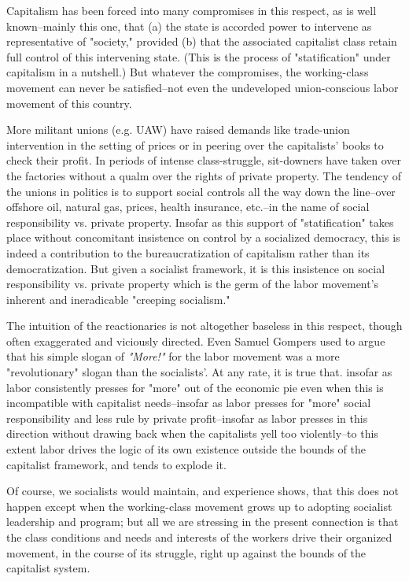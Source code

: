 Capitalism has been forced into many compromises in this respect, as is well known--mainly this one, that (a) the state is accorded power to intervene as representative of "society," provided (b) that the associated capitalist class retain full control of this intervening state. (This is the process of "statification" under capitalism in a nutshell.) But whatever the compromises, the working-class movement can never be satisfied--not even the undeveloped union-conscious labor movement of this country.

More militant unions (e.g. UAW) have raised demands like trade-union intervention in the setting of prices or in peering over the capitalists' books to check their profit. In periods of intense class-struggle, sit-downers have taken over the factories without a qualm over the rights of private property. The tendency of the unions in politics is to support social controls all the way down the line--over offshore oil, natural gas, prices, health insurance, etc.--in the name of social responsibility vs. private property. Insofar as this support of "statification" takes place without concomitant insistence on control by a socialized democracy, this is indeed a contribution to the bureaucratization of capitalism rather than its democratization. But given a socialist framework, it is this insistence on social responsibility vs. private property which is the germ of the labor movement's inherent and ineradicable "creeping socialism."

The intuition of the reactionaries is not altogether baseless in this respect, though often exaggerated and viciously directed. Even Samuel Gompers used to argue that his simple slogan of \emph{"More!"} for the labor movement was a more "revolutionary" slogan than the socialists'. At any rate, it is true that. insofar as labor consistently presses for "more" out of the economic pie even when this is incompatible with capitalist needs--insofar as labor presses for "more" social responsibility and less rule by private profit--insofar as labor presses in this direction without drawing back when the capitalists yell too violently--to this extent labor drives the logic of its own existence outside the bounds of the capitalist framework, and tends to explode it.

Of course, we socialists would maintain, and experience shows, that this does not happen except when the working-class movement grows up to adopting socialist leadership and program; but all we are stressing in the present connection is that the class conditions and needs and interests of the workers drive their organized movement, in the course of its struggle, right up against the bounds of the capitalist system.

